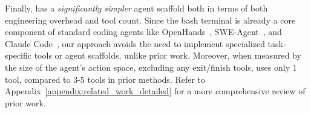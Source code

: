 Finally, \methodname has a \emph{significantly simpler} agent scaffold both in terms of both engineering overhead and tool count. Since the bash terminal is already a core component of standard coding agents like OpenHands~\citep{wang2025openhandssoftwareagentsdk}, SWE-Agent~\citep{yang2024sweagentagentcomputerinterfacesenable}, and Claude Code~\citep{anthropic_claude_code_2025}, our approach avoids the need to implement specialized task-specific tools or agent scaffolds, unlike prior work. Moreover, when measured by the size of the agent's action space, excluding any exit/finish tools, \methodname uses only 1 tool, compared to 3-5 tools in prior methods. Refer to Appendix~\ref{appendix:related_work_detailed} for a more comprehensive review of prior work.




